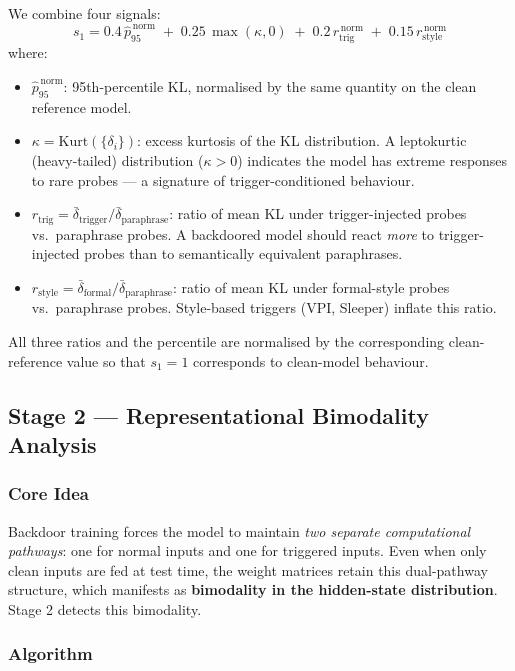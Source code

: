 \documentclass[11pt,a4paper]{article}
\begin{document}
We combine four signals:
\[
  s_1 = 0.4\,\hat{p}_{95}^{\,\text{norm}} \;+\; 0.25\,\max(\kappa, 0)
        \;+\; 0.2\,r_\text{trig}^{\,\text{norm}} \;+\; 0.15\,r_\text{style}^{\,\text{norm}}
\]
where:
\begin{itemize}[nosep]
  \item $\hat{p}_{95}^{\,\text{norm}}$: 95th-percentile KL, normalised by the
    same quantity on the clean reference model.
  \item $\kappa = \mathrm{Kurt}(\{\delta_i\})$: excess kurtosis of the KL
    distribution. A leptokurtic (heavy-tailed) distribution ($\kappa > 0$)
    indicates the model has extreme responses to rare probes --- a signature of
    trigger-conditioned behaviour.
  \item $r_\text{trig} = \bar{\delta}_\text{trigger} / \bar{\delta}_\text{paraphrase}$:
    ratio of mean KL under trigger-injected probes vs.\ paraphrase probes.
    A backdoored model should react \emph{more} to trigger-injected probes
    than to semantically equivalent paraphrases.
  \item $r_\text{style} = \bar{\delta}_\text{formal} / \bar{\delta}_\text{paraphrase}$:
    ratio of mean KL under formal-style probes vs.\ paraphrase probes.
    Style-based triggers (VPI, Sleeper) inflate this ratio.
\end{itemize}

All three ratios and the percentile are normalised by the corresponding
clean-reference value so that $s_1 = 1$ corresponds to clean-model behaviour.

\subsection{Stage 2 --- Representational Bimodality Analysis}
\label{sec:stage2}

\subsubsection{Core Idea}

Backdoor training forces the model to maintain \emph{two separate computational
pathways}: one for normal inputs and one for triggered inputs. Even when only
clean inputs are fed at test time, the weight matrices retain this dual-pathway
structure, which manifests as \textbf{bimodality in the hidden-state
distribution}. Stage 2 detects this bimodality.

\subsubsection{Algorithm}
\end{document}
